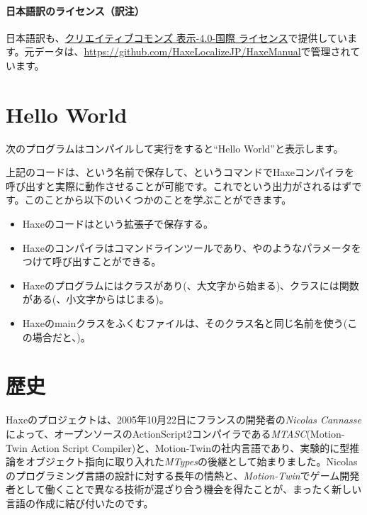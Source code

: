 \paragraph{日本語訳のライセンス（訳注）}

日本語訳も、\href{http://creativecommons.org/licenses/by/4.0/}{クリエイティブコモンズ 表示-4.0-国際 ライセンス}で提供しています。元データは、\href{https://github.com/HaxeLocalizeJP/HaxeManual}{https://github.com/HaxeLocalizeJP/HaxeManual}で管理されています。

\section{Hello World}
\label{introduction-hello-world}

次のプログラムはコンパイルして実行をすると``Hello World''と表示します。


上記のコードは、という名前で保存して、というコマンドでHaxeコンパイラを呼び出すと実際に動作させることが可能です。これでという出力がされるはずです。このことから以下のいくつかのことを学ぶことができます。


\begin{itemize}
	\item Haxeのコードはという拡張子で保存する。
	\item Haxeのコンパイラはコマンドラインツールであり、やのようなパラメータをつけて呼び出すことができる。
	\item Haxeのプログラムにはクラスがあり(、大文字から始まる)、クラスには関数がある(、小文字からはじまる)。 
	\item Haxeのmainクラスをふくむファイルは、そのクラス名と同じ名前を使う(この場合だと、)。
\end{itemize}

\section{歴史}
\label{introduction-haxe-history}

Haxeのプロジェクトは、2005年10月22日にフランスの開発者の\emph{Nicolas Cannasse}によって、オープンソースのActionScript2コンパイラである\emph{MTASC}(Motion-Twin Action Script Compiler)と、Motion-Twinの社内言語であり、実験的に型推論をオブジェクト指向に取り入れた\emph{MTypes}の後継として始まりました。Nicolasのプログラミング言語の設計に対する長年の情熱と、\emph{Motion-Twin}でゲーム開発者として働くことで異なる技術が混ざり合う機会を得たことが、まったく新しい言語の作成に結び付いたのです。


